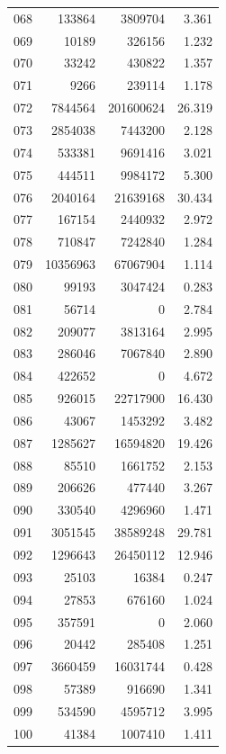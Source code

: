 \documentclass[anonymous,notoc]{gmcm2026}
\begin{document}
\begin{longtable}{lrrr}
068 & 133864 & 3809704 & 3.361 \\
069 & 10189 & 326156 & 1.232 \\
070 & 33242 & 430822 & 1.357 \\
071 & 9266 & 239114 & 1.178 \\
072 & 7844564 & 201600624 & 26.319 \\
073 & 2854038 & 7443200 & 2.128 \\
074 & 533381 & 9691416 & 3.021 \\
075 & 444511 & 9984172 & 5.300 \\
076 & 2040164 & 21639168 & 30.434 \\
077 & 167154 & 2440932 & 2.972 \\
078 & 710847 & 7242840 & 1.284 \\
079 & 10356963 & 67067904 & 1.114 \\
080 & 99193 & 3047424 & 0.283 \\
081 & 56714 & 0 & 2.784 \\
082 & 209077 & 3813164 & 2.995 \\
083 & 286046 & 7067840 & 2.890 \\
084 & 422652 & 0 & 4.672 \\
085 & 926015 & 22717900 & 16.430 \\
086 & 43067 & 1453292 & 3.482 \\
087 & 1285627 & 16594820 & 19.426 \\
088 & 85510 & 1661752 & 2.153 \\
089 & 206626 & 477440 & 3.267 \\
090 & 330540 & 4296960 & 1.471 \\
091 & 3051545 & 38589248 & 29.781 \\
092 & 1296643 & 26450112 & 12.946 \\
093 & 25103 & 16384 & 0.247 \\
094 & 27853 & 676160 & 1.024 \\
095 & 357591 & 0 & 2.060 \\
096 & 20442 & 285408 & 1.251 \\
097 & 3660459 & 16031744 & 0.428 \\
098 & 57389 & 916690 & 1.341 \\
099 & 534590 & 4595712 & 3.995 \\
100 & 41384 & 1007410 & 1.411 \\
\end{longtable}
\end{document}
